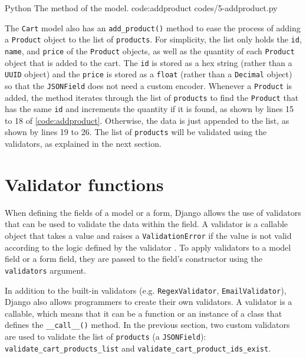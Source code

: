 \listing
{Python}
{The  method of the  model.}
{code:addproduct}
{codes/5-addproduct.py}

The \verb|Cart| model also has an \verb|add_product()| method to ease the
process of adding a \verb|Product| object to the list of \verb|products|. For
simplicity, the list only holds the \verb|id|, \verb|name|, and \verb|price| of
the \verb|Product| objects, as well as the quantity of each \verb|Product|
object that is added to the cart. The \verb|id| is stored as a hex string
(rather than a \verb|UUID| object) and the \verb|price| is stored as a
\verb|float| (rather than a \verb|Decimal| object) so that the \verb|JSONField|
does not need a custom encoder. Whenever a \verb|Product| is added, the method
iterates through the list of \verb|products| to find the \verb|Product| that
has the same \verb|id| and increments the quantity if it is found, as shown by
lines 15 to 18 of \autoref{code:addproduct}. Otherwise, the data is just
appended to the list, as shown by lines 19 to 26. The list of \verb|products|
will be validated using the validators, as explained in the next section.

\section{Validator functions}

When defining the fields of a model or a form, Django allows the use of
validators that can be used to validate the data within the field. A validator
is a callable object that takes a value and raises a \verb|ValidationError| if
the value is not valid according to the logic defined by the validator
\cite{django:validators}. To apply validators to a model field or a form field,
they are passed to the field's constructor using the \verb|validators|
argument.

In addition to the built-in validators (e.g. \verb|RegexValidator|,
\verb|EmailValidator|), Django also allows programmers to create their own
validators. A validator is a callable, which means that it can be a function or
an instance of a class that defines the \verb|__call__()| method. In the
previous section, two custom validators are used to validate the list of
\verb|products| (a \verb|JSONField|): \verb|validate_cart_products_list| and
\verb|validate_cart_product_ids_exist|.


